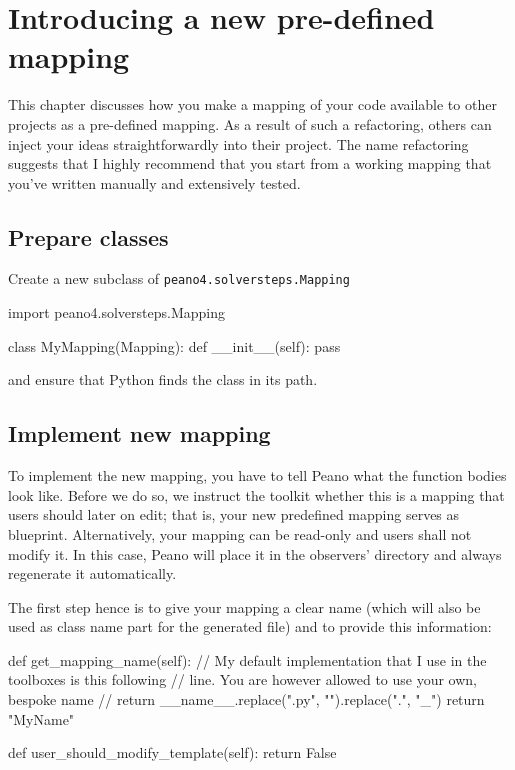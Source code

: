 \chapter{Introducing a new pre-defined mapping}
\label{section:logging}

This chapter discusses how you make a mapping of your code available to other
projects as a pre-defined mapping.
As a result of such a refactoring, others can inject your ideas
straightforwardly into their project.
The name refactoring suggests that I highly recommend that you start from a
working mapping that you've written manually and extensively tested.

\section{Prepare classes}

Create a new subclass of \texttt{peano4.solversteps.Mapping}

\begin{code}
import peano4.solversteps.Mapping

class MyMapping(Mapping):
  def __init__(self):
    pass
\end{code}

\noindent
and ensure that Python finds the class in its path.


\section{Implement new mapping}

To implement the new mapping, you have to tell Peano what the function bodies
look like.
Before we do so, we instruct the toolkit whether this is a mapping that users
should later on edit; 
that is, your new predefined mapping serves as blueprint.
Alternatively, your mapping can be read-only and users shall not modify it.
In this case, Peano will place it in the observers' directory and always
regenerate it automatically.


The first step hence is to give your mapping a clear name (which will also be
used as class name part for the generated file) and to provide this information:


\begin{code}
  def get_mapping_name(self):
    // My default implementation that I use in the toolboxes is this following
    // line. You are however allowed to use your own, bespoke name
    // return __name__.replace(".py", "").replace(".", "_")
    return "MyName"

  def user_should_modify_template(self):
    return False
\end{code}


